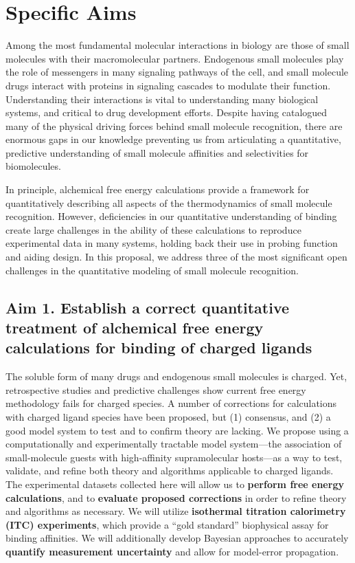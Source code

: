 \documentclass[10pt]{article}
\date{}
\begin{document}
\section*{\centering Specific Aims}
Among the most fundamental molecular interactions in biology are those of small molecules with their macromolecular partners.
Endogenous small molecules play the role of messengers in many signaling pathways of the cell, and small molecule drugs interact with proteins in signaling cascades to modulate their function.
Understanding their interactions is vital to understanding many biological systems, and critical to drug development efforts.
Despite having catalogued many of the physical driving forces behind small molecule recognition, there are enormous gaps in our knowledge preventing us from articulating a quantitative, predictive understanding of small molecule affinities and selectivities for biomolecules.

In principle, alchemical free energy calculations provide a framework for quantitatively describing all aspects of the thermodynamics of small molecule recognition. However, deficiencies in our quantitative understanding of binding create large challenges in the ability of these calculations to reproduce experimental data in many systems, holding back their use in probing function and aiding design.
In this proposal, we address three of the most significant open challenges in the quantitative modeling of small molecule recognition.


\subsection*{Aim 1. Establish a correct quantitative treatment of alchemical free energy calculations for binding of charged ligands}
The soluble form of many drugs and endogenous small molecules is charged.
Yet, retrospective studies and predictive challenges show current free energy methodology fails for charged species\cite{Rocklin2013b,Muddana2014a}.
A number of corrections for calculations with charged ligand species have been proposed, but (1) consensus, and (2) a good model system to test and to confirm theory are lacking.
We propose using a computationally and experimentally tractable model system---the association of small-molecule guests with high-affinity supramolecular hosts---as a way to test, validate, and refine both theory and algorithms applicable to charged ligands.
The experimental datasets collected here will allow us to \textbf{ perform free energy calculations}, and to \textbf{ evaluate proposed corrections} in order to refine theory and algorithms as necessary.
We will utilize \textbf{ isothermal titration calorimetry (ITC) experiments}, which provide a “gold standard” biophysical assay for binding affinities.
We will additionally develop Bayesian approaches to accurately \textbf{ quantify measurement uncertainty} and allow for model-error propagation.
\end{document}
